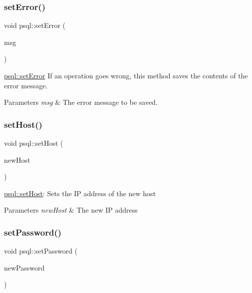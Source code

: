 \subsubsection{\texorpdfstring{set\+Error()}{setError()}}
{\footnotesize\ttfamily void psql\+::set\+Error (\begin{DoxyParamCaption}\item[{Q\+String}]{msg }\end{DoxyParamCaption})}



\hyperlink{classpsql_a9a0d5ba32aabe6018a36fb0bc185445b}{psql\+::set\+Error} If an operation goes wrong, this method saves the contents of the error message. 


\begin{DoxyParams}{Parameters}
{\em msg} & The error message to be saved. \\
\hline
\end{DoxyParams}
\mbox{\label{classpsql_a96b3b9483f1a642c026d4b5cf505eb75}} 
\subsubsection{\texorpdfstring{set\+Host()}{setHost()}}
{\footnotesize\ttfamily void psql\+::set\+Host (\begin{DoxyParamCaption}\item[{Q\+String}]{new\+Host }\end{DoxyParamCaption})}



\hyperlink{classpsql_a96b3b9483f1a642c026d4b5cf505eb75}{psql\+::set\+Host}\+: Sets the IP address of the new host 


\begin{DoxyParams}{Parameters}
{\em new\+Host} & The new IP address \\
\hline
\end{DoxyParams}
\mbox{\label{classpsql_a6c29350037550b7e5a5bb8f439c405f3}} 
\subsubsection{\texorpdfstring{set\+Password()}{setPassword()}}
{\footnotesize\ttfamily void psql\+::set\+Password (\begin{DoxyParamCaption}\item[{Q\+String}]{new\+Password }\end{DoxyParamCaption})}



